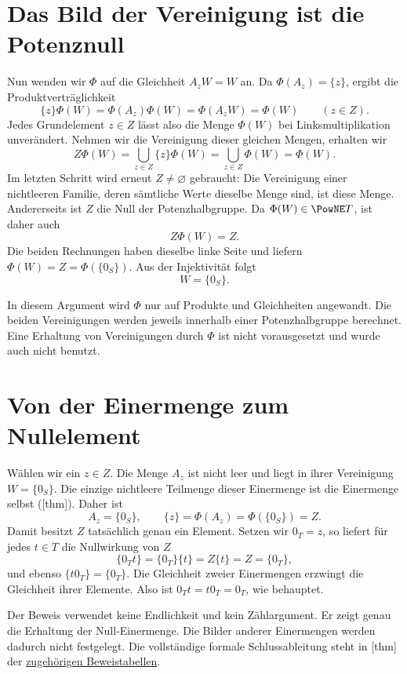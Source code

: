 \section{Das Bild der Vereinigung ist die Potenznull}

Nun wenden wir \(\Phi\) auf die Gleichheit \(A_zW=W\) an.
Da \(\Phi(A_z)=\{z\}\), ergibt die Produktverträglichkeit
\[
 \{z\}\Phi(W)
 =\Phi(A_z)\Phi(W)
 =\Phi(A_zW)=\Phi(W)
 \qquad(z\in Z).
\]
Jedes Grundelement \(z\in Z\) lässt also die Menge \(\Phi(W)\)
bei Linksmultiplikation unverändert. Nehmen wir die Vereinigung dieser
gleichen Mengen, erhalten wir
\[
 Z\Phi(W)
 =\bigcup_{z\in Z}\{z\}\Phi(W)
 =\bigcup_{z\in Z}\Phi(W)=\Phi(W).
\]
Im letzten Schritt wird erneut \(Z\neq\varnothing\) gebraucht:
Die Vereinigung einer nichtleeren Familie, deren sämtliche Werte
dieselbe Menge sind, ist diese Menge.
Andererseits ist \(Z\) die Null der Potenzhalbgruppe. Da
\(\Phi(W)\in\PowNE T\), ist daher auch
\[
 Z\Phi(W)=Z.
\]
Die beiden Rechnungen haben dieselbe linke Seite und liefern
\(\Phi(W)=Z=\Phi(\{0_S\})\). Aus der Injektivität folgt
\[
 W=\{0_S\}.
\]

In diesem Argument wird \(\Phi\) nur auf Produkte und Gleichheiten
angewandt. Die beiden Vereinigungen werden jeweils innerhalb einer
Potenzhalbgruppe berechnet. Eine Erhaltung von Vereinigungen durch
\(\Phi\) ist nicht vorausgesetzt und wurde auch nicht benutzt.

\section{Von der Einermenge zum Nullelement}

Wählen wir ein \(z\in Z\). Die Menge \(A_z\) ist nicht leer und
liegt in ihrer Vereinigung \(W=\{0_S\}\). Die einzige nichtleere
Teilmenge dieser Einermenge ist die Einermenge selbst
([thm]). Daher ist
\[
 A_z=\{0_S\},\qquad
 \{z\}=\Phi(A_z)=\Phi(\{0_S\})=Z.
\]
Damit besitzt \(Z\) tatsächlich genau ein Element. Setzen wir
\(0_T=z\), so liefert für jedes \(t\in T\) die Nullwirkung von
\(Z\)
\[
 \{0_Tt\}=\{0_T\}\{t\}=Z\{t\}=Z=\{0_T\},
\]
und ebenso \(\{t0_T\}=\{0_T\}\). Die Gleichheit zweier
Einermengen erzwingt die Gleichheit ihrer Elemente. Also ist
\(0_Tt=t0_T=0_T\), wie behauptet.

Der Beweis verwendet keine Endlichkeit und kein Zählargument.
Er zeigt genau die Erhaltung der Null-Einermenge. Die Bilder anderer
Einermengen werden dadurch nicht festgelegt.
Die vollständige formale Schlussableitung steht in
[thm] der
\href{_B28-zero-transport-proofs.pdf\#zero-transport.proofs}{zugehörigen Beweistabellen}.
